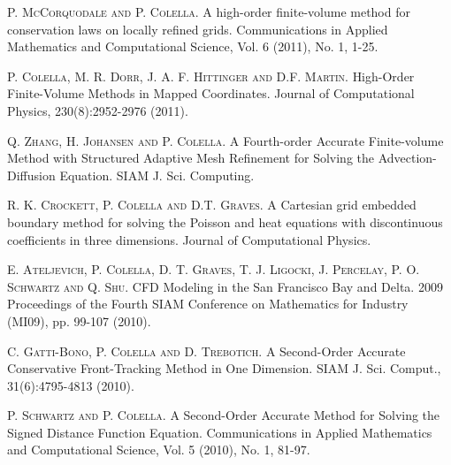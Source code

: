 
\begin{thebibliography}{10}
\textsc{P. McCorquodale and P. Colella}. {A high-order finite-volume method for conservation laws on locally refined grids}. Communications in Applied Mathematics and Computational Science, Vol. 6 (2011), No. 1, 1-25.

\textsc{P. Colella, M. R. Dorr, J. A. F. Hittinger and D.F. Martin}. {High-Order Finite-Volume Methods in Mapped Coordinates}. Journal of Computational Physics, 230(8):2952-2976 (2011).

\textsc{Q. Zhang, H. Johansen and P. Colella}. {A Fourth-order Accurate Finite-volume Method with Structured Adaptive Mesh Refinement for Solving the Advection-Diffusion Equation}. SIAM J. Sci. Computing.

\textsc{R. K. Crockett, P. Colella and D.T. Graves}. {A Cartesian grid embedded boundary method for solving the Poisson and heat equations with discontinuous coefficients in three dimensions}. Journal of Computational Physics.

\textsc{E. Ateljevich, P. Colella, D. T. Graves, T. J. Ligocki, J. Percelay, P. O. Schwartz and Q. Shu}. {CFD Modeling in the San Francisco Bay and Delta}. 2009 Proceedings of the Fourth SIAM Conference on Mathematics for Industry (MI09), pp. 99-107 (2010).

\textsc{C. Gatti-Bono, P. Colella and D. Trebotich}. {A Second-Order Accurate Conservative Front-Tracking Method in One Dimension}. SIAM J. Sci. Comput., 31(6):4795-4813 (2010).

\textsc{P. Schwartz and P. Colella}. {A Second-Order Accurate Method for Solving the Signed Distance Function Equation}. Communications in Applied Mathematics and Computational Science, Vol. 5 (2010), No. 1, 81-97.
\end{thebibliography}
